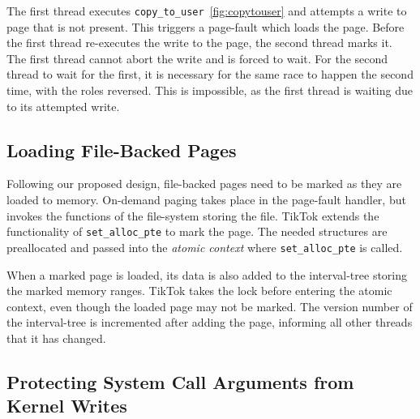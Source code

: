 \documentclass[conference]{IEEEtran}
\newcommand{\sysname}{TikTok}
\begin{document}
The first thread executes \texttt{copy\_to\_user}~\autoref{fig:copytouser} and
attempts a write to page that is not present. This triggers a page-fault which
loads the page. Before the first thread re-executes the write to the page, the
second thread marks it. The first thread cannot abort the write and is forced to
wait. For the second thread to wait for the first, it is necessary for the same
race to happen the second time, with the roles reversed. This is impossible,
as the first thread is waiting due to its attempted write.


\subsection{Loading File-Backed Pages}

Following our proposed design, file-backed pages need to be marked as
they are loaded to memory. On-demand paging takes place in the page-fault
handler, but invokes the functions of the file-system storing the file. \sysname{}
extends the functionality of \texttt{set\_alloc\_pte} to mark the page. The
needed structures are preallocated and passed into the \emph{atomic context} where 
\texttt{set\_alloc\_pte} is called.

When a marked page is loaded, its data is also added to the interval-tree
storing the marked memory ranges. \sysname{} takes the lock before entering the
atomic context, even though the loaded page may not be marked. The version
number of the interval-tree is incremented after adding the page, informing all
other threads that it has changed.


\subsection{Protecting System Call Arguments from Kernel Writes}
\end{document}
